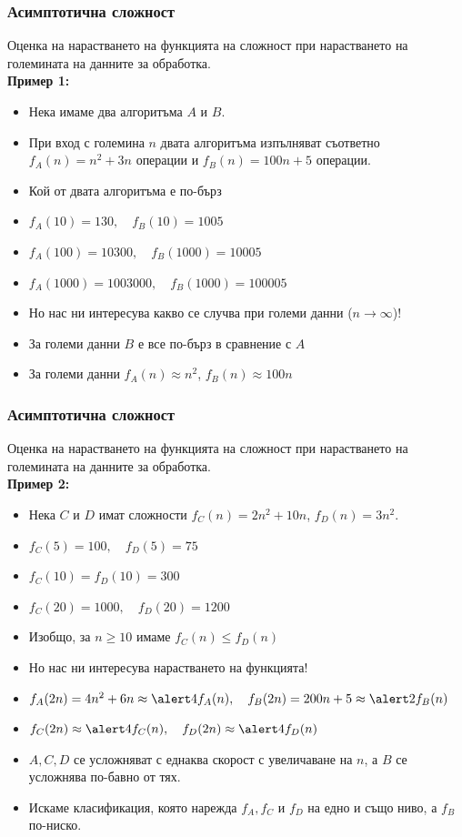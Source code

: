 \documentclass[alsotrans]{beamerswitch}
\begin{document}
\begin{frame}
  \frametitle{Асимптотична сложност}

  Оценка на нарастването на функцията на сложност при \alert<8>{нарастването} на големината на данните за обработка.\\
  \pause
  \textbf{Пример 1:}
  \begin{itemize}[<+->]
  \item Нека имаме два алгоритъма $A$ и $B$.
  \item При вход с големина $n$ двата алгоритъма изпълняват съответно $f_A(n) = n^2 + 3n$ операции и
    $f_B(n) = 100n + 5$ операции.
  \item<+-|alert@+-> Кой от двата алгоритъма е по-бърз
  \item $f_A(10) = 130,\quad f_B(10) = 1005$
  \item $f_A(100) = 10300,\quad f_B(1000) = 10005$
  \item $f_A(1000) = 1003000,\quad f_B(1000) = 100005$
  \item Но нас ни интересува какво се случва при \alert{големи данни ($n \to \infty$)}!
  \item За големи данни $B$ е все по-бърз в сравнение с $A$
  \item За големи данни $f_A(n) \approx n^2$, $f_B(n) \approx 100n$
  \end{itemize}
\end{frame}

\begin{frame}
  \frametitle{Асимптотична сложност}

  Оценка на \alert<6>{нарастването} на функцията на сложност при нарастването на големината на данните за обработка.\\
  \textbf{Пример 2:}
  \begin{itemize}[<+->]
  \item Нека $C$ и $D$ имат сложности $f_C(n) = 2n^2 + 10n$, $f_D(n) = 3n^2$.
  \item $f_C(5) = 100,\quad f_D(5)= 75$
  \item $f_C(10) = f_D(10) = 300$
  \item $f_C(20) = 1000,\quad f_D(20) = 1200$
  \item Изобщо, за $n \geq 10$ имаме $f_C(n) \leq f_D(n)$
  \item Но нас ни интересува \alert{нарастването} на функцията!
  \item $f_A(2n) = 4n^2 + 6n \approx \alert4f_A(n), \quad f_B(2n) = 200n + 5 \approx \alert2f_B(n)$
  \item $f_C(2n) \approx \alert4f_C(n),\quad f_D(2n) \approx \alert4f_D(n)$
  \item $A, C, D$ се усложняват с еднаква скорост с увеличаване на $n$, а $B$ се усложнява по-бавно от тях.
  \item Искаме класификация, която нарежда $f_A, f_C$ и $f_D$ на едно и също ниво, а $f_B$ по-ниско.
  \end{itemize}
\end{frame}
\end{document}
